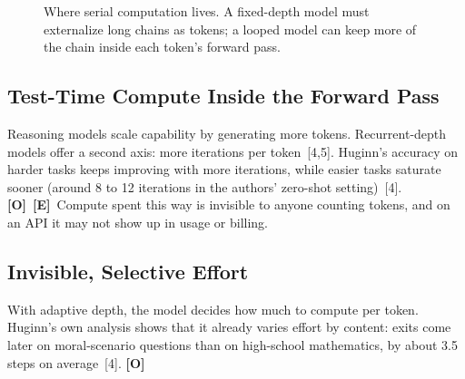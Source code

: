 \documentclass[11pt,letterpaper]{article}
\newcommand{\mO}{\textcolor{sensorteal}{\textbf{[O]}}}
\newcommand{\mE}{\textcolor{deepindigo}{\textbf{[E]}}}
\begin{document}
\begin{figure}[htbp]
\caption[Where serial computation lives]{Where serial computation lives. A fixed-depth model must externalize long chains as tokens; a looped model can keep more of the chain inside each token's forward pass.}
\label{fig:hidden}
\end{figure}

\subsection{Test-Time Compute Inside the Forward Pass}

Reasoning models scale capability by generating more tokens. Recurrent-depth models offer a second axis: more iterations per token~[4,5]. Huginn's accuracy on harder tasks keeps improving with more iterations, while easier tasks saturate sooner (around 8 to 12 iterations in the authors' zero-shot setting)~[4]. \mO\ \mE\ Compute spent this way is invisible to anyone counting tokens, and on an API it may not show up in usage or billing.

\subsection{Invisible, Selective Effort}

With adaptive depth, the model decides how much to compute per token. Huginn's own analysis shows that it already varies effort by content: exits come later on moral-scenario questions than on high-school mathematics, by about 3.5 steps on average~[4]. \mO
\end{document}
